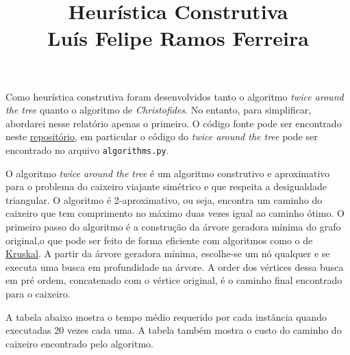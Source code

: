 \documentclass{article}
\title{\vspace{-3em} Heurística Construtiva \\ Luís Felipe Ramos Ferreira \vspace{-3em}}
\date{}
\begin{document}
\maketitle

Como heurística construtiva foram desenvolvidos tanto o algoritmo \textit{twice around the tree} quanto o algoritmo de \textit{Christofides}.
No entanto, para simplificar, abordarei nesse relatório apenas o primeiro. O código fonte pode ser encontrado neste \href{https://github.com/lframosferreira/tsp-heuristics}{repositório}, em particular
o código do \textit{twice around the tree} pode ser encontrado no arquivo \texttt{algorithms.py}.

O algoritmo \textit{twice around the tree} é um algoritmo construtivo e aproximativo para o problema do caixeiro viajante simétrico e que respeita a desigualdade triangular. O algoritmo é 2-aproximativo, ou seja,
encontra um caminho do caixeiro que tem comprimento no máximo duas vezes igual ao caminho ótimo. O primeiro passo do algoritmo é a construção da árvore geradora mínima do grafo original,o que pode ser feito de forma eficiente com algoritmos como o de \href{https://en.wikipedia.org/wiki/Kruskal\%27s\_algorithm}{Kruskal}. A partir da árvore geradora mínima, escolhe-se um nó qualquer e se executa uma busca em profundidade na árvore. A order dos vértices dessa busca em pré ordem, concatenado com o vértice original, é o caminho final encontrado para o caixeiro. 

A tabela abaixo mostra o tempo médio requerido por cada instância quando executadas 20 vezes cada uma. A tabela também mostra o custo do caminho do caixeiro encontrado pelo algoritmo.
\end{document}
